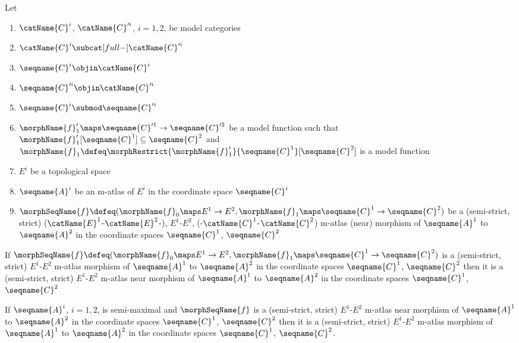 \documentclass{article}
\begin{document}
\begin{corollary}
\label{cor:M-ATLmorph}
Let
\begin{enumerate}
\item
$\catName{C}^i$, $\catName{C}'^i$, $i=1,2$, be model categories

\item
$\catName{C}^i \subcat[full-] \catName{C}'^i$

\item
$\seqname{C}^i \objin \catName{C}^i$

\item
$\seqname{C}'^i \objin \catName{C}'^i$

\item
$\seqname{C}^i \submod \seqname{C}'^i$

\item
$\morphName{f}'_1 \maps \seqname{C}'^1 \to \seqname{C}'^2$ be a model
function such that
$\morphName{f}'_1[\seqname{C}^1] \subseteq \seqname{C}^2$ and
$
  \morphName{f}_1 \defeq
  \morphRestrict{\morphName{f}'_1}{\seqname{C}^1}[\seqname{C}^2]
$
is a model function

\item
$E^i$ be a topological space

\item
$\seqname{A}^i$ be an m-atlas of $E^i$ in the coordinate space
$\seqname{C}^i$

\item
$
  \morphSeqName{f} \defeq
  (
    \morphName{f}_0 \maps E^1 \to E^2,
    \morphName{f}_1 \maps \seqname{C}^1 \to \seqname{C}^2
  )
$
be a (semi-strict, strict)
\nobreaks
  {
    {($\catName{E}^1$-$\catName{E}^2$-)},
    {$E^1$-$E^2$},
    {(-$\catName{C}^1$-$\catName{C}^2$)}
  }
m-atlas (near) morphism of $\seqname{A}^1$ to $\seqname{A}^2$ in the
coordinate spaces $\seqname{C}^1$, $\seqname{C}^2$
\end{enumerate}

If
$
  \morphSeqName{f} \defeq
  (
    \morphName{f}_0 \maps E^1 \to E^2,
    \morphName{f}_1 \maps \seqname{C}^1 \to \seqname{C}^2
  )
$
is a (semi-strict, strict) $E^1$-$E^2$ m-atlas morphism of
$\seqname{A}^1$ to $\seqname{A}^2$ in the coordinate spaces
$\seqname{C}^1$, $\seqname{C}^2$ then it is a (semi-strict, strict)
$E^1$-$E^2$ m-atlas near morphism of $\seqname{A}^1$ to $\seqname{A}^2$
in the coordinate spaces $\seqname{C}^1$, $\seqname{C}^2$

If $\seqname{A}^i$, $i=1,2$, is semi-maximal and $\morphSeqName{f}$ is a
(semi-strict, strict) $E^1$-$E^2$ m-atlas near morphism of
$\seqname{A}^1$ to $\seqname{A}^2$ in the coordinate spaces
$\seqname{C}^1$, $\seqname{C}^2$ then it is a (semi-strict, strict)
$E^1$-$E^2$ m-atlas morphism of $\seqname{A}^1$ to $\seqname{A}^2$ in
the coordinate spaces $\seqname{C}^1$, $\seqname{C}^2$.


\end{corollary}
\end{document}
